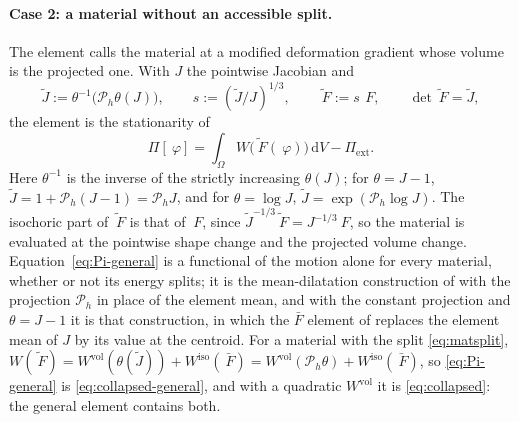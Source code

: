 \documentclass[11pt]{article}
\newcommand{\F}{~F}
\newcommand{\disp}{~\varphi}
\newcommand{\diff}{\,\mathrm{d}}
\newcommand{\supvol}{^{\mathrm{vol}}}
\newcommand{\supiso}{^{\mathrm{iso}}}
\theoremstyle{definition}
\theoremstyle{plain}
\begin{document}
\paragraph{Case 2: a material without an accessible split.} The element
calls the material at a modified deformation gradient whose volume is the
projected one. With $J$ the pointwise Jacobian and
\begin{equation}
  \label{eq:Ftilde}
  \tilde J := \theta^{-1}\!\big(\mathcal{P}_h\theta(J)\big),
  \qquad
  s := (\tilde J / J)^{1/3},
  \qquad
  \tilde{\F} := s\,\F,
  \qquad \det\tilde{\F} = \tilde J ,
\end{equation}
the element is the stationarity of
\begin{equation}
  \label{eq:Pi-general}
  \Pi[\disp] = \int_\Omega W\big(\tilde{\F}(\disp)\big) \diff V - \Pi_{\mathrm{ext}} .
\end{equation}
Here $\theta^{-1}$ is the inverse of the strictly increasing
$\theta(J)$; for $\theta = J - 1$, $\tilde J = 1 + \mathcal{P}_h(J - 1) =
\mathcal{P}_h J$, and for $\theta = \log J$, $\tilde J = \exp(\mathcal{P}_h
\log J)$. The isochoric part of $\tilde{\F}$ is that of $\F$, since
$\tilde J^{-1/3}\tilde{\F} = J^{-1/3}\F$, so the material is evaluated at
the pointwise shape change and the projected volume change.
Equation~\eqref{eq:Pi-general} is a functional of the motion alone for
every material, whether or not its energy splits; it is the mean-dilatation
construction of \citet{SimoTaylorPister:1985} with the projection
$\mathcal{P}_h$ in place of the element mean, and with the constant
projection and $\theta = J - 1$ it is that construction, in which the
$\bar F$ element of \citet{deSouzaNeto.etal:1996} replaces the element mean
of $J$ by its value at the centroid. For a material with the split
\eqref{eq:matsplit}, $W(\tilde{\F}) = W\supvol(\theta(\tilde J)) +
W\supiso(\bar{\F}) = W\supvol(\mathcal{P}_h\theta) + W\supiso(\bar{\F})$,
so \eqref{eq:Pi-general} is \eqref{eq:collapsed-general}, and with a
quadratic $W\supvol$ it is \eqref{eq:collapsed}: the general element
contains both.
\end{document}
